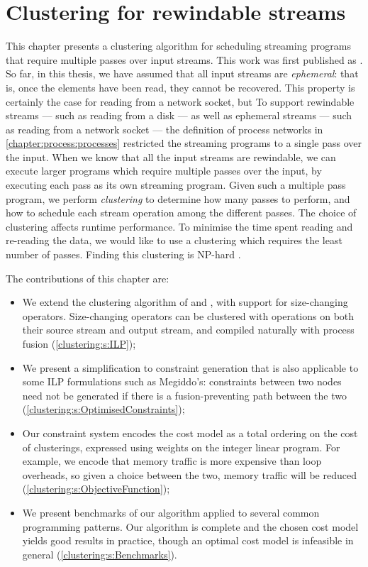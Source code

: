 \chapter{Clustering for rewindable streams}
\label{clustering}



This chapter presents a clustering algorithm for scheduling streaming programs that require multiple passes over input streams.
This work was first published as \citet{robinson2014fusing}.
So far, in this thesis, we have assumed that all input streams are \emph{ephemeral}: that is, once the elements have been read, they cannot be recovered.
This property is certainly the case for reading from a network socket, but 
To support rewindable streams --- such as reading from a disk --- as well as ephemeral streams --- such as reading from a network socket --- the definition of process networks in \cref{chapter:process:processes} restricted the streaming programs to a single pass over the input.
When we know that all the input streams are rewindable, we can execute larger programs which require multiple passes over the input, by executing each pass as its own streaming program.
Given such a multiple pass program, we perform \emph{clustering} to determine how many passes to perform, and how to schedule each stream operation among the different passes.
The choice of clustering affects runtime performance.
To minimise the time spent reading and re-reading the data, we would like to use a clustering which requires the least number of passes.
Finding this clustering is NP-hard \cite{darte1999complexity}.

The contributions of this chapter are:
\begin{itemize}
\item   
We extend the clustering algorithm of \citet{megiddo1998optimal} and \citet{darte2002contraction}, with support for size-changing operators.
Size-changing operators can be clustered with operations on both their source stream and output stream, and compiled naturally with process fusion (\cref{clustering:s:ILP});

\item
We present a simplification to constraint generation that is also applicable to some ILP formulations such as Megiddo's:
constraints between two nodes need not be generated if there is a fusion-preventing path between the two (\cref{clustering:s:OptimisedConstraints});

\item
Our constraint system encodes the cost model as a total ordering on the cost of clusterings, expressed using weights on the integer linear program.
For example, we encode that memory traffic is more expensive than loop overheads, so given a choice between the two, memory traffic will be reduced (\cref{clustering:s:ObjectiveFunction});

\item
We present benchmarks of our algorithm applied to several common programming patterns.
Our algorithm is complete and the chosen cost model yields good results in practice, though an optimal cost model is infeasible in general (\cref{clustering:s:Benchmarks}).
\end{itemize}

